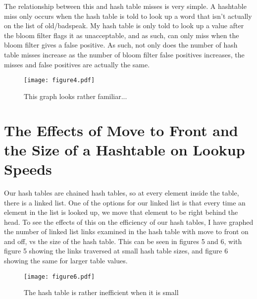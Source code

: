 \documentclass[11pt]{article}
\begin{document}
The relationship between this and hash table misses is very simple. A hashtable miss only occurs when the hash table is told to look up a word that isn't actually on the list of old/badspeak. My hash table is only told to look up a value after the bloom filter flags it as unacceptable, and as such, can only miss when the bloom filter gives a false positive. As such, not only does the number of hash table misses increase as the number of bloom filter false positives increases, the misses and false positives are actually the same.

\begin{figure}[tbp]
\begin{centering}
\texttt{[image: figure4.pdf]}
\caption{This graph looks rather familiar...}
\end{centering}
\end{figure}

\section{The Effects of Move to Front and the Size of a Hashtable on Lookup Speeds}

Our hash tables are chained hash tables, so at every element inside the table, there is a linked list. One of the options for our linked list is that every time an element in the list is looked up, we move that element to be right behind the head. To see the effects of this on the efficiency of our hash tables, I have graphed the number of linked list links examined in the hash table with move to front on and off, vs the size of the hash table. This can be seen in figures 5 and 6, with figure 5 showing the links traversed at small hash table sizes, and figure 6 showing the same for larger table values.

\begin{figure}[tbp]
\begin{centering}
\texttt{[image: figure6.pdf]}
\caption{The hash table is rather inefficient when it is small}
\end{centering}
\end{figure}
\end{document}
